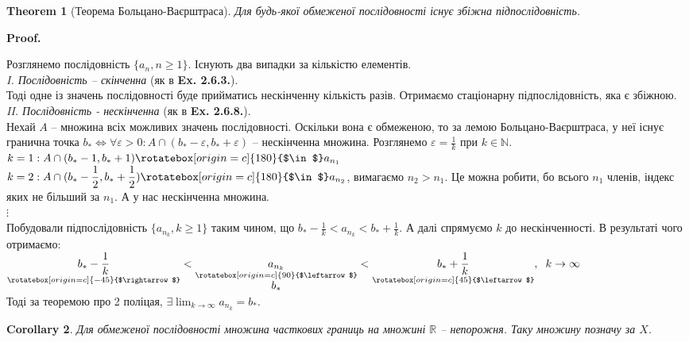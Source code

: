 \documentclass[a4paper, 14pt]{article}
\makeatletter
\def\qed{$\blacksquare$}
\theoremstyle{theoremdd}
\newtheorem{theorem}{Theorem}[subsection]
\theoremstyle{theoremdd}
\theoremstyle{theoremdd}
\theoremstyle{theoremdd}
\theoremstyle{theoremdd}
\theoremstyle{theoremdd}
\theoremstyle{theoremdd}
\theoremstyle{theoremdd}
\newtheorem{corollary}[theorem]{Corollary}
\renewenvironment{proof}[1][Proof.\\]{\par
\pushQED{\hfill \qed}%
\normalfont \topsep6\p@\@plus6\p@\relax
\trivlist
\item\relax
{\bfseries
#1\@addpunct{.}}\hspace\labelsep\ignorespaces
}{%
\popQED\endtrivlist\@endpefalse
}
\makeatother
\begin{document}
	\begin{theorem}[Теорема Больцано-Ваєрштраса]
	Для будь-якої обмеженої послідовності існує збіжна підпослідовність.
	\end{theorem}
	
	\begin{proof}
	Розглянемо послідовність $\{a_n, n \geq 1\}$. Існують два випадки за кількістю елементів.
	\bigskip \\
	\textit{I. Послідовність -- скінченна} (як в \textbf{Ex. 2.6.3.}). \\
	Тоді одне із значень послідовності буде прийматись нескінченну кількість разів. Отримаємо стаціонарну підпослідовність, яка є збіжною.
	\bigskip \\
	\textit{II. Послідовність - нескінченна} (як в \textbf{Ex. 2.6.8.}). \\
	Нехай $A$ -- множина всіх можливих значень послідовності. Оскільки вона є обмеженою, то за лемою Больцано-Ваєрштраса, у неї існує гранична точка $b_* \iff \forall \varepsilon > 0:A \cap (b_*-\varepsilon, b_*+\varepsilon)$ -- нескінченна множина. Розглянемо $\varepsilon = \displaystyle \frac{1}{k}$ при $k \in \mathbb{N}$.\\
	$\displaystyle k = 1: A \cap(b_*-1, b_*+1) \rotatebox[origin=c]{180}{$\in$}a_{n_1}$\\
	$\displaystyle k = 2: A \cap(b_*-\frac{1}{2}, b_*+\frac{1}{2}) \rotatebox[origin=c]{180}{$\in$}a_{n_2}$, вимагаємо $n_2>n_1$. Це можна робити, бо всього $n_1$ членів, індекс яких не більший за $n_1$. А у нас нескінченна множина.\\
	$\vdots$\\
	Побудовали підпослідовність $\{a_{n_k}, k \geq 1\}$ таким чином, що $\displaystyle b_*-\frac{1}{k} < a_{n_k} < b_*+\frac{1}{k}$. А далі спрямуємо $k$ до нескінченності. В результаті чого отримаємо:\\
	$\displaystyle \underset{\rotatebox[origin=c]{-45}{$\rightarrow$}}{b_*-\frac{1}{k}} < \underset{\underset{\displaystyle b_*}{\rotatebox[origin=c]{90}{$\leftarrow$}}}{a_{n_k}} < \underset{\rotatebox[origin=c]{45}{$\leftarrow$}}{b_*+\frac{1}{k}}, \hspace{0.2cm} k \to \infty$\\
	Тоді за теоремою про 2 поліцая, $\displaystyle \exists \lim_{k \to \infty} a_{n_k} = b_*$.
	\end{proof}
	
	\begin{corollary}
	Для обмеженої послідовності множина часткових границь на множині $\mathbb{R}$ -- непорожня. Таку множину позначу за $X$.
	\end{corollary}
		
\end{document}
